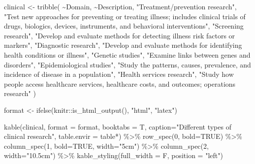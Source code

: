 \documentclass[
  letterpaper,
  DIV=11,
  numbers=noendperiod,
  oneside]{scrartcl}
\newenvironment{Shaded}{\begin{snugshade}}{\end{snugshade}}
\newcommand{\AttributeTok}[1]{\textcolor[rgb]{0.40,0.45,0.13}{#1}}
\newcommand{\ConstantTok}[1]{\textcolor[rgb]{0.56,0.35,0.01}{#1}}
\newcommand{\DecValTok}[1]{\textcolor[rgb]{0.68,0.00,0.00}{#1}}
\newcommand{\FunctionTok}[1]{\textcolor[rgb]{0.28,0.35,0.67}{#1}}
\newcommand{\NormalTok}[1]{\textcolor[rgb]{0.00,0.23,0.31}{#1}}
\newcommand{\OtherTok}[1]{\textcolor[rgb]{0.00,0.23,0.31}{#1}}
\newcommand{\SpecialCharTok}[1]{\textcolor[rgb]{0.37,0.37,0.37}{#1}}
\newcommand{\StringTok}[1]{\textcolor[rgb]{0.13,0.47,0.30}{#1}}
\begin{document}
\begin{Shaded}
\begin{Highlighting}[]
\NormalTok{  clinical }\OtherTok{\textless{}{-}} \FunctionTok{tribble}\NormalTok{(}
    \SpecialCharTok{\textasciitilde{}}\NormalTok{Domain, }\SpecialCharTok{\textasciitilde{}}\NormalTok{Description,}
    \StringTok{"Treatment/prevention research"}\NormalTok{, }\StringTok{"Test new approaches for preventing or treating illness; includes clinical trials of drugs, biologics, devices, instruments, and behavioral interventions"}\NormalTok{,}
    \StringTok{"Screening research"}\NormalTok{, }\StringTok{"Develop and evaluate methods for detecting illness risk factors or markers"}\NormalTok{,}
    \StringTok{"Diagnostic research"}\NormalTok{, }\StringTok{"Develop and evaluate methods for identifying health conditions or illness"}\NormalTok{, }
    \StringTok{"Genetic studies"}\NormalTok{, }\StringTok{"Examine links between genes and disorders"}\NormalTok{, }
    \StringTok{"Epidemiological studies"}\NormalTok{, }\StringTok{"Study the patterns, causes, prevalence, and incidence of disease in a population"}\NormalTok{,}
    \StringTok{"Health services research"}\NormalTok{, }\StringTok{"Study how people access healthcare services, healthcare costs, and outcomes; operations research"}
\NormalTok{  )}
  
\NormalTok{format }\OtherTok{\textless{}{-}} \FunctionTok{ifelse}\NormalTok{(knitr}\SpecialCharTok{::}\FunctionTok{is\_html\_output}\NormalTok{(), }\StringTok{"html"}\NormalTok{, }\StringTok{"latex"}\NormalTok{)}

\FunctionTok{kable}\NormalTok{(clinical, }\AttributeTok{format =}\NormalTok{ format, }\AttributeTok{booktabs =}\NormalTok{ T,}
\AttributeTok{caption=}\StringTok{"Different types of clinical research"}\NormalTok{, }\AttributeTok{table.envir =} \StringTok{\textquotesingle{}table*\textquotesingle{}}\NormalTok{) }\SpecialCharTok{\%\textgreater{}\%}
  \FunctionTok{row\_spec}\NormalTok{(}\DecValTok{0}\NormalTok{, }\AttributeTok{bold=}\ConstantTok{TRUE}\NormalTok{) }\SpecialCharTok{\%\textgreater{}\%}
  \FunctionTok{column\_spec}\NormalTok{(}\DecValTok{1}\NormalTok{, }\AttributeTok{bold=}\ConstantTok{TRUE}\NormalTok{, }\AttributeTok{width=}\StringTok{"5cm"}\NormalTok{) }\SpecialCharTok{\%\textgreater{}\%}
  \FunctionTok{column\_spec}\NormalTok{(}\DecValTok{2}\NormalTok{, }\AttributeTok{width=}\StringTok{"10.5cm"}\NormalTok{) }\SpecialCharTok{\%\textgreater{}\%}
    \FunctionTok{kable\_styling}\NormalTok{(}\AttributeTok{full\_width =}\NormalTok{ F, }\AttributeTok{position =} \StringTok{"left"}\NormalTok{)}
\end{Highlighting}
\end{Shaded}
\end{document}
